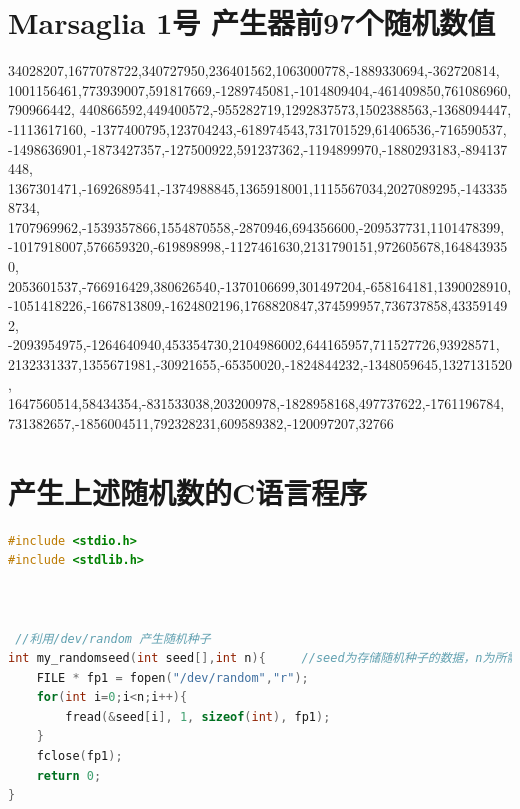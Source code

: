\documentclass[a4paper,11pt]{article}
\begin{document}
\begin{appendices}


\section{Marsaglia 1号 产生器前97个随机数值}
\label{97}
34028207,1677078722,340727950,236401562,1063000778,-1889330694,-362720814, \\ 1001156461,773939007,591817669,-1289745081,-1014809404,-461409850,761086960, \\790966442, 440866592,449400572,-955282719,1292837573,1502388563,-1368094447,\\ -1113617160, -1377400795,123704243,-618974543,731701529,61406536,-716590537, \\ -1498636901,-1873427357,-127500922,591237362,-1194899970,-1880293183,-894137448, \\ 1367301471,-1692689541,-1374988845,1365918001,1115567034,2027089295,-1433358734, \\ 1707969962,-1539357866,1554870558,-2870946,694356600,-209537731,1101478399, \\
-1017918007,576659320,-619898998,-1127461630,2131790151,972605678,1648439350, \\
2053601537,-766916429,380626540,-1370106699,301497204,-658164181,1390028910, \\
-1051418226,-1667813809,-1624802196,1768820847,374599957,736737858,433591492, \\ -2093954975,-1264640940,453354730,2104986002,644165957,711527726,93928571, \\
2132331337,1355671981,-30921655,-65350020,-1824844232,-1348059645,1327131520, \\
1647560514,58434354,-831533038,203200978,-1828958168,497737622,-1761196784, \\ 731382657,-1856004511,792328231,609589382,-120097207,32766


\section{产生上述随机数的C语言程序}

\begin{lstlisting}[language = C]
#include <stdio.h>
#include <stdlib.h>



 //利用/dev/random 产生随机种子
int my_randomseed(int seed[],int n){     //seed为存储随机种子的数据，n为所需要种子的个数
    FILE * fp1 = fopen("/dev/random","r");
    for(int i=0;i<n;i++){
        fread(&seed[i], 1, sizeof(int), fp1);
    }
    fclose(fp1);
    return 0;
}
 

\end{lstlisting}
\end{appendices}
\end{document}

